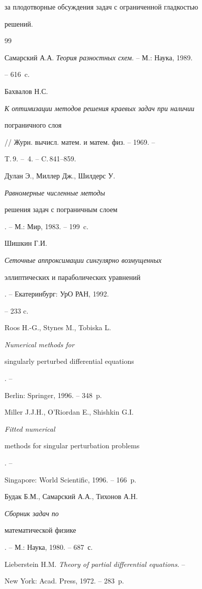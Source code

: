 за плодотворные обсуждения задач с ограниченной гладкостью


решений.





\begin{thebibliography}{99}




Самарский А.А. {\em Теория разностных схем}. -- М.: Наука, 1989.


-- 616~c.




Бахвалов Н.С. {\em К оптимизации методов решения краевых задач при наличии


пограничного слоя} // Журн. вычисл. матем. и матем. физ. -- 1969. --


T.\,9. -- \No\,4. -- C.\,841--859.




Дулан Э., Миллер Дж., Шилдерс У. {\em Равномерные численные методы


решения задач с пограничным слоем}. -- М.: Мир, 1983. -- 199~c.




Шишкин Г.И. {\em Сеточные аппроксимации сингулярно возмущенных


эллиптических и параболических уравнений}. -- Екатеринбург: УрО РАН, 1992.


-- 233 c.




Roos H.-G., Stynes M., Tobiska L. {\em Numerical methods for


singularly perturbed differential equations}. --


Berlin: Springer, 1996. -- 348~p.




Miller J.J.H., O'Riordan E., Shishkin G.I. {\em Fitted numerical


methods for singular perturbation problems}. --


Singapore: World Scientific, 1996. -- 166~p.




Будак Б.М., Самарский А.А., Тихонов А.Н. {\em Сборник задач по 


математической физике}. -- М.: Наука, 1980. -- 687~с.




Lieberstein H.M. {\em Theory of partial differential equations}. --


New York: Acad. Press, 1972. -- 283~p.



\end{thebibliography}
